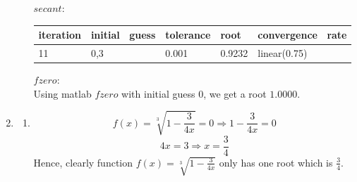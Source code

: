 \documentclass[11pt,twoside]{article}
\begin{document}
\begin{enumerate}[leftmargin=0pt]
\begin{enumerate}
		$secant:$
		\begin{longtable}{|>{\tiny}p{0.5in}|>{\tiny} p{0.5in}| >{\tiny}p{0.5in}|>{\tiny}p{0.5in}|	
		 	>{\tiny} p{0.8in}|}\hline
			iteration&initial \ guess&tolerance&root&convergence \ rate \\[0.1in]\hline
			11 &0,3&0.001&0.9232& linear(0.75)\\[0.1in] \hline
		\end{longtable} 
		$fzero:$ \\
		Using matlab  $fzero$ with initial guess $0$, we get a root $1.0000$.
	\end{enumerate}
\item
	\begin{enumerate}
	\item 
	\[ f(x) =\sqrt[3]{1-\frac{3}{4x}} = 0 \Rightarrow  1-\frac{3}{4x} = 0\]
	\[4x = 3 \Rightarrow x =\frac{3}{4}\]
	Hence, clearly function $ f(x) =\sqrt[3]{1-\frac{3}{4x}}$ only has one root which is $\frac{3}{4}$.
	

\end{enumerate}
\end{enumerate}
\end{document}
